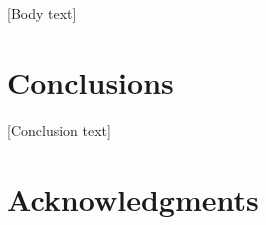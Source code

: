 \documentclass{sig-alternate}
\begin{document}
[Body text]

\section{Conclusions}
\label{sec:conclusions}

[Conclusion text]

\section*{Acknowledgments}
\label{sec:acknowledgments}



  
\end{document}
